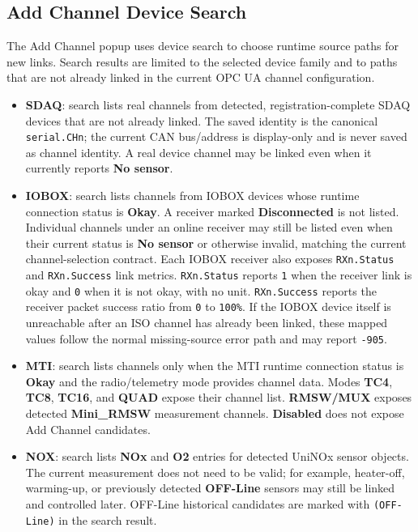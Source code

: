 \documentclass[11pt,a4paper]{article}
\begin{document}
\subsection{Add Channel Device Search}
The Add Channel popup uses device search to choose runtime source paths for new links.
Search results are limited to the selected device family and to paths that are not already linked in the current OPC UA channel configuration.

\begin{itemize}
\item \textbf{SDAQ}: search lists real channels from detected, registration-complete SDAQ devices that are not already linked. The saved identity is the canonical \texttt{serial.CHn}; the current CAN bus/address is display-only and is never saved as channel identity. A real device channel may be linked even when it currently reports \textbf{No sensor}.
\item \textbf{IOBOX}: search lists channels from IOBOX devices whose runtime connection status is \textbf{Okay}. A receiver marked \textbf{Disconnected} is not listed. Individual channels under an online receiver may still be listed even when their current status is \textbf{No sensor} or otherwise invalid, matching the current channel-selection contract. Each IOBOX receiver also exposes \texttt{RXn.Status} and \texttt{RXn.Success} link metrics. \texttt{RXn.Status} reports \texttt{1} when the receiver link is okay and \texttt{0} when it is not okay, with no unit. \texttt{RXn.Success} reports the receiver packet success ratio from \texttt{0} to \texttt{100\%}. If the IOBOX device itself is unreachable after an ISO channel has already been linked, these mapped values follow the normal missing-source error path and may report \texttt{-905}.
\item \textbf{MTI}: search lists channels only when the MTI runtime connection status is \textbf{Okay} and the radio/telemetry mode provides channel data. Modes \textbf{TC4}, \textbf{TC8}, \textbf{TC16}, and \textbf{QUAD} expose their channel list. \textbf{RMSW/MUX} exposes detected \textbf{Mini\_RMSW} measurement channels. \textbf{Disabled} does not expose Add Channel candidates.
\item \textbf{NOX}: search lists \textbf{NOx} and \textbf{O2} entries for detected UniNOx sensor objects. The current measurement does not need to be valid; for example, heater-off, warming-up, or previously detected \textbf{OFF-Line} sensors may still be linked and controlled later. OFF-Line historical candidates are marked with \texttt{(OFF-Line)} in the search result.
\end{itemize}
\end{document}
